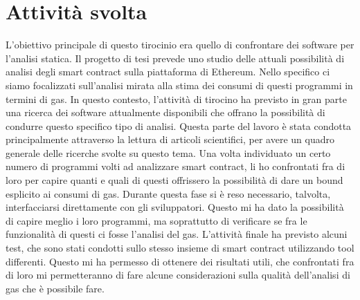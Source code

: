 \documentclass[a4paper,10pt]{article}
\begin{document}
\section{Attività svolta}
L'obiettivo principale di questo tirocinio era quello di confrontare dei software per l'analisi statica.\newline
Il progetto di tesi prevede uno studio delle attuali possibilità di analisi degli smart contract sulla piattaforma di Ethereum. Nello specifico ci siamo focalizzati sull'analisi mirata alla stima dei consumi di questi programmi in termini di gas.\newline
In questo contesto, l'attività di tirocino ha previsto in gran parte una ricerca dei software attualmente disponibili che offrano la possibilità di condurre questo specifico tipo di analisi. Questa parte del lavoro è stata condotta principalmente attraverso la lettura di articoli scientifici, per avere un quadro generale delle ricerche svolte su questo tema.\newline 
Una volta individuato un certo numero di programmi volti ad analizzare smart contract, li ho confrontati fra di loro per capire quanti e quali di questi offrissero la possibilità di dare un bound esplicito ai consumi di gas. Durante questa fase si è reso necessario, talvolta, interfacciarsi direttamente con gli sviluppatori. Questo mi ha dato la possibilità di capire meglio i loro programmi, ma soprattutto di verificare se fra le funzionalità di questi ci fosse l'analisi del gas.\newline
L'attività finale ha previsto alcuni test, che sono stati condotti sullo stesso insieme di smart contract utilizzando tool differenti. Questo mi ha permesso di ottenere dei risultati utili, che confrontati fra di loro mi permetteranno di fare alcune considerazioni sulla qualità dell'analisi di gas che è possibile fare.\newline
\end{document}
